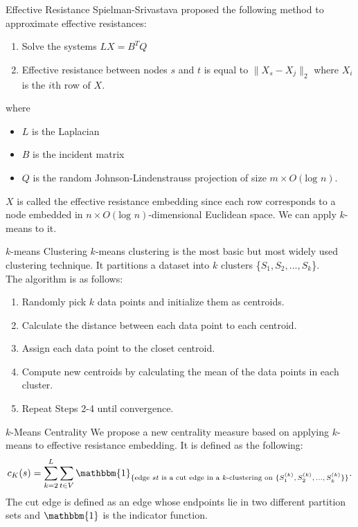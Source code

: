 \documentclass{beamer}
\begin{document}
\begin{frame}{Effective Resistance}
Spielman-Srivastava proposed the following method to approximate effective resistances:
\begin{enumerate}
\item Solve the systems $LX = B^TQ$
\item Effective resistance between nodes $s$ and $t$ is equal to $\|X_s - X_j\|_2$ where $X_i$ is the $i$th row of $X$.
\end{enumerate}
where
\begin{itemize}
\item $L$ is the Laplacian
\item $B$ is the incident matrix
\item $Q$ is the random Johnson-Lindenstrauss projection of size $m \times O(\textrm{log }n)$.
\end{itemize}
$X$ is called the effective resistance embedding since each row corresponds to a node embedded in $n \times O(\textrm{log }n)$-dimensional Euclidean space. We can apply $k$-means to it.
\end{frame}

\begin{frame}{$k$-means Clustering}
$k$-means clustering is the most basic but most widely used clustering technique. It partitions a dataset into $k$ clusters \{$S_1, S_2, ..., S_k$\}. \\
\bigskip\noindent
The algorithm is as follows:
\begin{enumerate}
\item Randomly pick $k$ data points and initialize them as centroids. 
\item Calculate the distance between each data point to each centroid.
\item Assign each data point to the closet centroid. 
\item Compute new centroids by calculating the mean of the data points in each cluster.
\item Repeat Steps 2-4 until convergence.
\end{enumerate}
\end{frame}

\begin{frame}{$k$-Means Centrality}
We propose a new centrality measure based on applying $k$-means to effective resistance embedding. It is defined as the following:
\begin{align*}
c_{K}(s) = \sum_{k = 2}^L \sum_{t\in V} \mathbbm{1} _{\{\textrm{edge $st$ is a cut edge in a $k$-clustering on $\{S_1^{(k)}, S_2^{(k)}, ..., S_k^{(k)}\}$}\}}.
\end{align*}
The cut edge is defined as an edge whose endpoints lie in two different partition sets and $\mathbbm{1}$ is the indicator function.
\end{frame}
\end{document}
